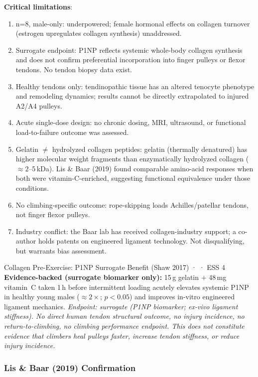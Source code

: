 \textbf{Critical limitations}:
\begin{enumerate}[noitemsep]
  \item n=8, male-only: underpowered; female hormonal effects on collagen turnover (estrogen upregulates collagen synthesis) unaddressed.
  \item Surrogate endpoint: P1NP reflects systemic whole-body collagen synthesis and does not confirm preferential incorporation into finger pulleys or flexor tendons. No tendon biopsy data exist.
  \item Healthy tendons only: tendinopathic tissue has an altered tenocyte phenotype and remodeling dynamics; results cannot be directly extrapolated to injured A2/A4 pulleys.
  \item Acute single-dose design: no chronic dosing, MRI, ultrasound, or functional load-to-failure outcome was assessed.
  \item Gelatin $\ne$ hydrolyzed collagen peptides: gelatin (thermally denatured) has higher molecular weight fragments than enzymatically hydrolyzed collagen (${\approx}2$--5\,kDa). Lis \& Baar (2019) found comparable amino-acid responses when both were vitamin-C-enriched, suggesting functional equivalence under those conditions.
  \item No climbing-specific outcome: rope-skipping loads Achilles/patellar tendons, not finger flexor pulleys.
  \item Industry conflict: the Baar lab has received collagen-industry support; a co-author holds patents on engineered ligament technology. Not disqualifying, but warrants bias assessment.
\end{enumerate}

\begin{evidencebox}{Collagen Pre-Exercise: P1NP Surrogate Benefit (Shaw 2017) · \evidencebacked · ESS 4}
\textbf{Evidence-backed (surrogate biomarker only):} 15\,g gelatin $+$ 48\,mg vitamin~C taken 1\,h before intermittent loading acutely elevates systemic P1NP in healthy young males (${\approx}2{\times}$; $p{<}0.05$) and improves in-vitro engineered ligament mechanics. \textit{Endpoint: surrogate (P1NP biomarker; ex-vivo ligament stiffness). No direct human tendon structural outcome, no injury incidence, no return-to-climbing, no climbing performance endpoint. This does not constitute evidence that climbers heal pulleys faster, increase tendon stiffness, or reduce injury incidence.}
\end{evidencebox}

\subsubsection{Lis \& Baar (2019) Confirmation}

